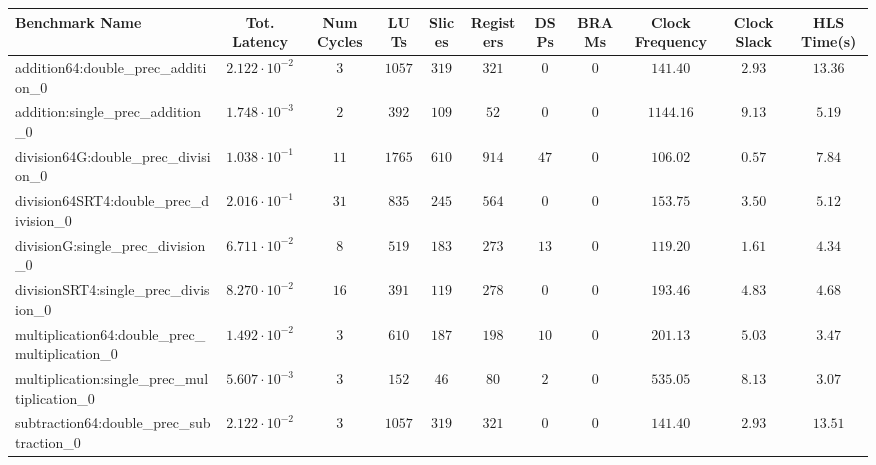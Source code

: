 \begin{tabular}{|l|c|c|c|c|c|c|c|c|c|c|}
\hline
Benchmark Name                                   & Tot. Latency            & Num Cycles & LUTs     & Slices   & Registers & DSPs   & BRAMs & Clock Frequency & Clock Slack & HLS Time(s) \\
\hline
addition64:double\_prec\_addition\_0             & $ 2.122 \cdot 10^{-2} $ & $ 3      $ & $ 1057 $ & $ 319  $ & $ 321   $ & $ 0  $ & $ 0 $ & $ 141.40      $ & $ 2.93    $ & $ 13.36   $ \\
addition:single\_prec\_addition\_0               & $ 1.748 \cdot 10^{-3} $ & $ 2      $ & $ 392  $ & $ 109  $ & $ 52    $ & $ 0  $ & $ 0 $ & $ 1144.16     $ & $ 9.13    $ & $ 5.19    $ \\
division64G:double\_prec\_division\_0            & $ 1.038 \cdot 10^{-1} $ & $ 11     $ & $ 1765 $ & $ 610  $ & $ 914   $ & $ 47 $ & $ 0 $ & $ 106.02      $ & $ 0.57    $ & $ 7.84    $ \\
division64SRT4:double\_prec\_division\_0         & $ 2.016 \cdot 10^{-1} $ & $ 31     $ & $ 835  $ & $ 245  $ & $ 564   $ & $ 0  $ & $ 0 $ & $ 153.75      $ & $ 3.50    $ & $ 5.12    $ \\
divisionG:single\_prec\_division\_0              & $ 6.711 \cdot 10^{-2} $ & $ 8      $ & $ 519  $ & $ 183  $ & $ 273   $ & $ 13 $ & $ 0 $ & $ 119.20      $ & $ 1.61    $ & $ 4.34    $ \\
divisionSRT4:single\_prec\_division\_0           & $ 8.270 \cdot 10^{-2} $ & $ 16     $ & $ 391  $ & $ 119  $ & $ 278   $ & $ 0  $ & $ 0 $ & $ 193.46      $ & $ 4.83    $ & $ 4.68    $ \\
multiplication64:double\_prec\_multiplication\_0 & $ 1.492 \cdot 10^{-2} $ & $ 3      $ & $ 610  $ & $ 187  $ & $ 198   $ & $ 10 $ & $ 0 $ & $ 201.13      $ & $ 5.03    $ & $ 3.47    $ \\
multiplication:single\_prec\_multiplication\_0   & $ 5.607 \cdot 10^{-3} $ & $ 3      $ & $ 152  $ & $ 46   $ & $ 80    $ & $ 2  $ & $ 0 $ & $ 535.05      $ & $ 8.13    $ & $ 3.07    $ \\
subtraction64:double\_prec\_subtraction\_0       & $ 2.122 \cdot 10^{-2} $ & $ 3      $ & $ 1057 $ & $ 319  $ & $ 321   $ & $ 0  $ & $ 0 $ & $ 141.40      $ & $ 2.93    $ & $ 13.51   $ \\

\end{tabular}
